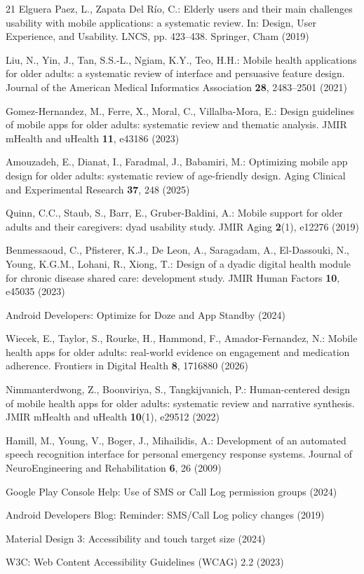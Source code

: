 \documentclass[runningheads,a4paper]{llncs}
\begin{document}
\begin{thebibliography}{21}
Elguera Paez, L., Zapata Del R\'io, C.: Elderly users and their main challenges usability
with mobile applications: a systematic review. In: Design, User Experience, and Usability.
LNCS, pp. 423--438. Springer, Cham (2019)

Liu, N., Yin, J., Tan, S.S.-L., Ngiam, K.Y., Teo, H.H.: Mobile health applications for
older adults: a systematic review of interface and persuasive feature design. Journal of
the American Medical Informatics Association \textbf{28}, 2483--2501 (2021)

Gomez-Hernandez, M., Ferre, X., Moral, C., Villalba-Mora, E.: Design guidelines of mobile
apps for older adults: systematic review and thematic analysis. JMIR mHealth and uHealth
\textbf{11}, e43186 (2023)

Amouzadeh, E., Dianat, I., Faradmal, J., Babamiri, M.: Optimizing mobile app design for
older adults: systematic review of age-friendly design. Aging Clinical and Experimental
Research \textbf{37}, 248 (2025)

Quinn, C.C., Staub, S., Barr, E., Gruber-Baldini, A.: Mobile support for older adults and
their caregivers: dyad usability study. JMIR Aging \textbf{2}(1), e12276 (2019)

Benmessaoud, C., Pfisterer, K.J., De Leon, A., Saragadam, A., El-Dassouki, N., Young,
K.G.M., Lohani, R., Xiong, T.: Design of a dyadic digital health module for chronic disease
shared care: development study. JMIR Human Factors \textbf{10}, e45035 (2023)

Android Developers: Optimize for Doze and App Standby (2024)

Wiecek, E., Taylor, S., Rourke, H., Hammond, F., Amador-Fernandez, N.: Mobile health apps
for older adults: real-world evidence on engagement and medication adherence. Frontiers in
Digital Health \textbf{8}, 1716880 (2026)

Nimmanterdwong, Z., Boonviriya, S., Tangkijvanich, P.: Human-centered design of mobile
health apps for older adults: systematic review and narrative synthesis. JMIR mHealth and
uHealth \textbf{10}(1), e29512 (2022)

Hamill, M., Young, V., Boger, J., Mihailidis, A.: Development of an automated speech
recognition interface for personal emergency response systems. Journal of NeuroEngineering
and Rehabilitation \textbf{6}, 26 (2009)

Google Play Console Help: Use of SMS or Call Log permission groups (2024)

Android Developers Blog: Reminder: SMS/Call Log policy changes (2019)

Material Design 3: Accessibility and touch target size (2024)

W3C: Web Content Accessibility Guidelines (WCAG) 2.2 (2023)

\end{thebibliography}
\end{document}
